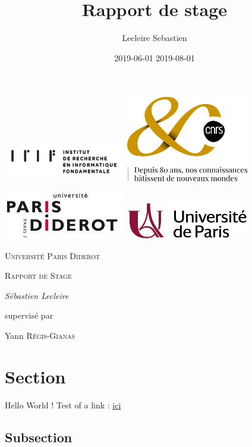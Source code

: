 \documentclass{article}
\title{Rapport de stage}
\date{2019-06-01 2019-08-01}
\author{Lecleire Sebastien}
\begin{document}
\begin{titlepage}
	\centering
	\includegraphics[width=0.4\textwidth]{irif_horizontal}
	\includegraphics[width=0.4\textwidth]{Logo80ANS_OR}\par\vspace{1cm}
	\includegraphics[width=0.4\textwidth]{logop7}
	\includegraphics[width=0.4\textwidth]{Universite_Paris_logo_horizontal}\par\vspace{1cm}
	{\scshape\LARGE Université Paris Diderot \par}
	\vspace{1cm}
	{\scshape\Large Rapport de Stage\par}
	\vspace{1.5cm}
	{\Large\itshape Sébastien Lecleire\par}
	\vfill
	supervisé par\par
	Yann \textsc{Régis-Gianas}

	\vfill
\end{titlepage}


\newpage

\tableofcontents
\newpage

\section{Section}
Hello World !
Test of a link : \href{http://www.atec.com}{ici}
\subsection{Subsection}
\end{document}
